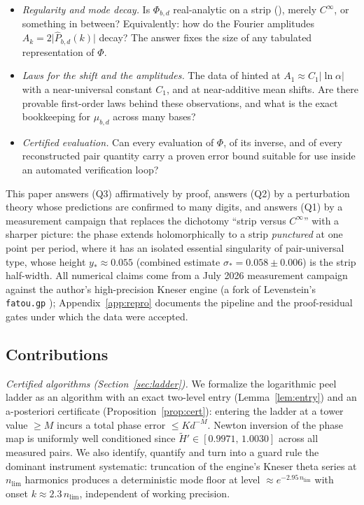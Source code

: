 \documentclass[11pt,a4paper]{article}
\theoremstyle{definition}
\theoremstyle{remark}
\begin{document}
\begin{itemize}
\item[(Q1)] \emph{Regularity and mode decay.} Is $\Phi_{b,d}$ real-analytic on a strip
(\cite[Conj.~8.1]{phaselaw}), merely $C^\infty$, or something in between? Equivalently: how do
the Fourier amplitudes $A_k=2\lvert\widehat P_{b,d}(k)\rvert$ decay? The answer fixes the size
of any tabulated representation of $\Phi$.
\item[(Q2)] \emph{Laws for the shift and the amplitudes.} The data of \cite{phaselaw} hinted at
$A_1\approx C_1\lvert\ln\alpha\rvert$ with a near-universal constant $C_1$, and at near-additive
mean shifts. Are there provable first-order laws behind these observations, and what is the
exact bookkeeping for $\mu_{b,d}$ across many bases?
\item[(Q3)] \emph{Certified evaluation.} Can every evaluation of $\Phi$, of its inverse, and of
every reconstructed pair quantity carry a proven error bound suitable for use inside an
automated verification loop?
\end{itemize}

This paper answers (Q3) affirmatively by proof, answers (Q2) by a perturbation theory whose
predictions are confirmed to many digits, and answers (Q1) by a measurement campaign that
replaces the dichotomy ``strip versus $C^\infty$'' with a sharper picture: the phase extends
holomorphically to a strip \emph{punctured} at one point per period, where it has an isolated
essential singularity of pair-universal type, whose height $y_*\approx0.055$ (combined
estimate $\sigma_*=0.058\pm0.006$) is the strip
half-width. All numerical claims come from a July 2026 measurement campaign against the
author's high-precision Kneser engine (a fork of Levenstein's \texttt{fatou.gp}
\cite{fatou}); Appendix~\ref{app:repro} documents the pipeline and the proof-residual gates
under which the data were accepted.

\subsection{Contributions}

\emph{Certified algorithms (Section~\ref{sec:ladder}).} We formalize the logarithmic peel
ladder as an algorithm with an exact two-level entry (Lemma~\ref{lem:entry}) and an
a-posteriori certificate (Proposition~\ref{prop:cert}): entering the ladder at a tower value
$\ge M$ incurs a total phase error $\le K d^{-M}$. Newton inversion of the phase map is
uniformly well conditioned since $\widetilde H'\in[0.9971,\,1.0030]$ across all measured
pairs. We also identify, quantify and turn into a guard rule the dominant instrument
systematic: truncation of the engine's Kneser theta series at $n_{\mathrm{lim}}$ harmonics
produces a deterministic mode floor at level $\approx e^{-2.95\,n_{\mathrm{lim}}}$ with onset
$k\approx 2.3\,n_{\mathrm{lim}}$, independent of working precision.
\end{document}
